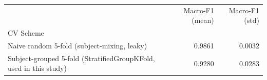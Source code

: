 \begin{tabular}{lrr}
\toprule
 & Macro-F1 (mean) & Macro-F1 (std) \\
CV Scheme &  &  \\
\midrule
Naive random 5-fold (subject-mixing, leaky) & 0.9861 & 0.0032 \\
Subject-grouped 5-fold (StratifiedGroupKFold, used in this study) & 0.9280 & 0.0283 \\
\bottomrule
\end{tabular}
